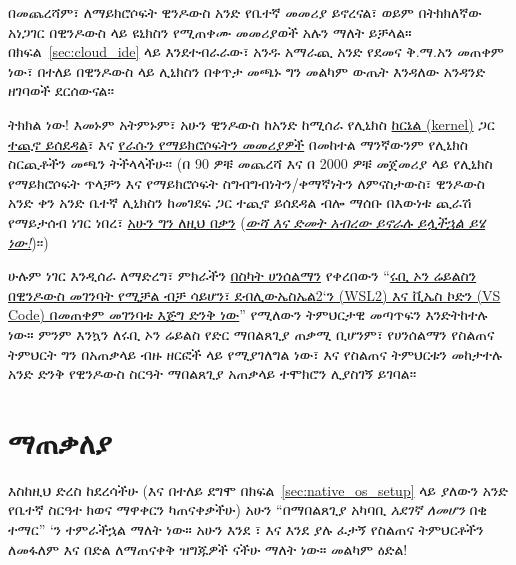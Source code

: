 በመጨረሻም፣ ለማይክሮሶፍት ዊንዶውስ አንድ የቤተኛ መመሪያ ይኖረናል፣ ወይም በትክክለኛው አነጋገር በዊንዶውስ ላይ ዩኒክስን የሚጠቀሙ መመሪያወች አሉን ማለት ይቻላል። በክፍል~\ref{sec:cloud_ide} ላይ እንደተብራራው፣ አንዱ አማራጪ አንድ የደመና ቅ.ማ.አን መጠቀም ነው፣ በተለይ በዊንዶውስ ላይ ሊኒክስን በቀጥታ መጫኑ ግን መልካም ውጤት እንዳለው አንዳንድ ዘገባወች ደርሰውናል፡፡

ትክክል ነው! እመኑም አትምኑም፣ አሁን ዊንዶውስ ከአንድ ከሚሰራ የሊኒክስ \href{https://en.wikipedia.org/wiki/Kernel_(operating_system)}{ከርኔል (kernel)} ጋር \href{https://devblogs.microsoft.com/commandline/announcing-wsl-2/}{ተጪኖ ይሰደዳል}፣ እና \href{https://docs.microsoft.com/en-us/windows/wsl/install-win10}{የራሱን የማይክሮሶፍትን መመሪያዎች} በመከተል ማንኛውንም የሊኒክስ ስርጪቶችን መጫን ትችላላችሁ፡፡ (በ 90 ዎቹ መጨረሻ እና በ 2000 ዎቹ መጀመሪያ ላይ የሊኒክስ የማይክሮሶፍት ጥላቻን እና የማይክሮሶፍት ስግብግብነትን/ቀማኛነትን ለምናስታውስ፣ ዊንዶውስ አንድ ቀን አንድ ቤተኛ ሊኒክስን ከመገደፍ ጋር ተጪኖ ይሰደዳል ብሎ ማሰቡ በእውነቱ ጪራሽ የማይታሰብ ነገር ነበረ፣ \href{https://docs.microsoft.com/en-us/windows/wsl/install-win10}{አሁን ግን ለዚህ በቃን} (\href{https://youtu.be/JmzuRXLzqKk}{\emph{ውሻ እና ድመት አብረው ይኖራሉ ይሏችኋል ይሄ ነው!}})፡፡)

ሁሉም ነገር እንዲሰራ ለማድረግ፣ ምክራችን \href{https://www.hanselman.com/}{በስካት ሀንሰልማን} የቀረበውን ``\href{https://www.hanselman.com/blog/RubyOnRailsOnWindowsIsNotJustPossibleItsFabulousUsingWSL-8AndVSCode.aspx}{ሩቢ ኦን ሬይልስን በዊንዶውስ መገንባት የሚቻል ብቻ ሳይሆን፣ ደብሊውኤስኤል2`ን (WSL2) እና ቪኤስ ኮድን (VS Code) በመጠቀም መገንባቱ እጅግ ድንቅ ነው}'' የሚለውን ትምህርታዊ መጣጥፍን እንድትከተሉ ነው። ምንም እንኳን ለሩቢ ኦን ሬይልስ የድር ማበልጸጊያ ጠቃሚ ቢሆንም፣ የሀንሰልማን የስልጠና ትምህርት ግን በአጠቃላይ ብዙ ዘርፎች ላይ የሚያገለግል ነው፣ እና የስልጠና ትምህርቱን መከታተሉ አንድ ድንቅ የዊንዶውስ ስርዓት ማበልጸጊያ አጠቃላይ ተሞክሮን ሊያስገኝ ይገባል፡፡



\section{ማጠቃለያ} %
\label{sec:conclusion}

እስከዚህ ድረስ ከደረሳችሁ (እና በተለይ ደግሞ በክፍል~\ref{sec:native_os_setup} ላይ ያለውን አንድ የቤተኛ ስርዓተ ክወና ማዋቀርን ካጠናቀቃችሁ) አሁን ``በማበልጸጊያ አካባቢ \emph{አደገኛ ለመሆን} በቂ ተማር'' `ን ተምራችኋል ማለት ነው። አሁን እንደ \lecss\/፣ \ler እና እንደ \rort ያሉ ፈታኝ የስልጠና ትምህርቶችን ለመፋለም እና በድል ለማጠናቀቅ ዝግጁዎች ናችሁ ማለት ነው። መልካም ዕድል!


\bigskip

